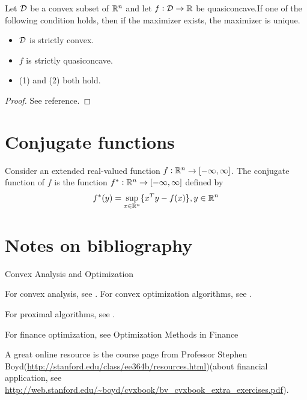 \begin{refsection}
\begin{theorem}\cite[364]{jiang2000advanced}\label{ch:convex-analysis:th:uniqueGlobalOptimizerStrictQuasiconcavity}
	Let $\mathcal{D}$ be a convex subset of $\mathbb{R}^n$ and let $f:\mathcal{D}\to \mathbb{R}$ be quasiconcave.If one of the following condition holds, then if the maximizer exists, the maximizer is unique.
	\begin{itemize}
		\item $\mathcal{D}$ is strictly convex. 
		\item $f$ is strictly quasiconcave. 
		\item (1) and (2) both hold.
	\end{itemize}		
\end{theorem}
\begin{proof}
	See reference. 
\end{proof}


\section{Conjugate functions}

\begin{definition}\cite[82]{bertsekas2009convex}
Consider an extended real-valued function $f:\mathbb{R}^n\to [-\infty,\infty]$. The conjugate function of $f$ is the function $f^*:\mathbb{R}^n \to [-\infty,\infty]$ defined by
$$f^*(y) = \sup_{x\in \mathbb{R}^n}\{x^Ty - f(x)\}, y\in \mathbb{R}^n$$
\end{definition}


\section{Notes on bibliography}

\cite{mordukhovich2013easy}

Convex Analysis and Optimization

For convex analysis, see \cite{bertsekas2009convex}.
For convex optimization algorithms, see \cite{bertsekas2015convex}.

For proximal algorithms, see \cite{parikh2014proximal}.

For finance optimization, see Optimization Methods in Finance


A great online  resource is the course page from Professor Stephen Boyd(\url{http://stanford.edu/class/ee364b/resources.html})(about financial application, see \url{http://web.stanford.edu/~boyd/cvxbook/bv_cvxbook_extra_exercises.pdf}). 

\printbibliography

\end{refsection}

